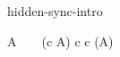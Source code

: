 \begin{circuslaw}{hidden-sync-intro}
\begin{circusaction*}
  A ~ \equiv ~ (c \then A) \circhide \lchanset c \rchanset \; \provided \; c \notin \usedC(A)
\end{circusaction*}
\end{circuslaw}
